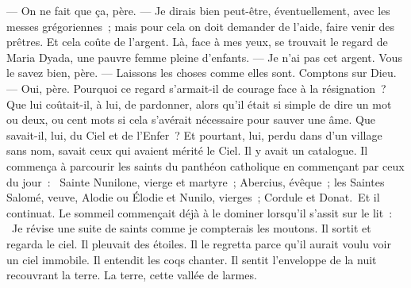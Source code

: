 \pend
%
\pstart
  \guillemotright --- On ne fait que ça, père.
\pend
%
\pstart
  \guillemotright --- Je dirais bien peut-être, éventuellement, avec les messes grégoriennes ; mais pour cela on doit demander de l’aide, faire venir des prêtres. Et cela coûte de l'argent.
\pend
%
\pstart
  \guillemotright Là, face à mes yeux, se trouvait le regard de Maria Dyada, une pauvre femme pleine d’enfants.
\pend
%
\pstart
  \guillemotright --- Je n’ai pas cet argent. Vous le savez bien, père.
\pend
%
\pstart
  \guillemotright --- Laissons les choses comme elles sont. Comptons sur Dieu.
\pend
%
\pstart
  \guillemotright --- Oui, père.\fg{}
\pend
%
\pstart
  Pourquoi ce regard s’armait-il de courage face à la résignation ? Que lui coûtait-il, à lui, de pardonner, alors qu’il était si simple de dire un mot ou deux, ou cent mots si cela s’avérait nécessaire pour sauver une âme. Que savait-il, lui, du Ciel et de l’Enfer ? Et pourtant, lui, perdu dans d’un village sans nom, savait ceux qui avaient mérité le Ciel. Il y avait un catalogue. Il commença à parcourir les saints du panthéon catholique en commençant par ceux du jour : \og{} Sainte Nunilone, vierge et martyre ; Abercius, évêque ; les Saintes Salomé, veuve, Alodie ou Élodie et Nunilo, vierges ; Cordule et Donat. \fg{}Et il continuat. Le sommeil commençait déjà à le dominer lorsqu’il s’assit sur le lit : \og{} Je révise une suite de saints comme je compterais les moutons.\fg{}
\pend
%
\pstart
  Il sortit et regarda le ciel. Il pleuvait des étoiles. Il le regretta parce qu’il aurait voulu voir un ciel immobile. Il entendit les coqs chanter. Il sentit l’enveloppe de la nuit recouvrant la terre. La terre, \og{}cette vallée de larmes\fg{}.
\pend
